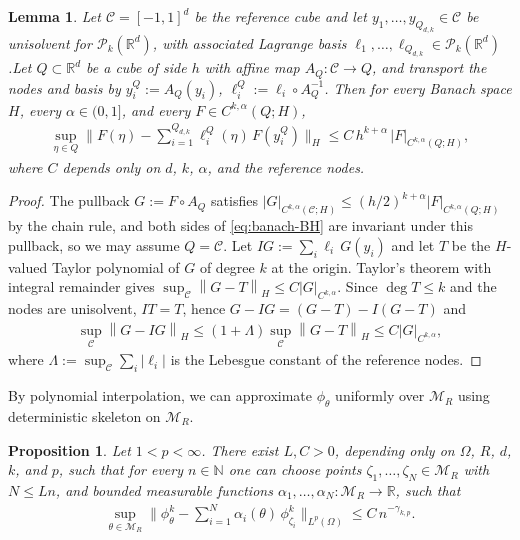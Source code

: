 \documentclass[12pt]{article}
\numberwithin{equation}{section}
\newtheorem{proposition}{Proposition}[section]
\newtheorem{lemma}{Lemma}[section]
\numberwithin{figure}{section}
\numberwithin{equation}{section}
\newcommand{\R}{\mathbb{R}}
\newcommand{\N}{\mathbb{N}}
\newcommand{\Ccal}{\mathcal C}
\newcommand{\MR}{\mathcal M_R}
\newcommand{\norm}[1]{\left\|#1\right\|}
\newcommand{\abs}[1]{\left|#1\right|}
\begin{document}
\begin{lemma}
\label{lem:banach-bramble-hilbert}
Let $\mathcal{C}=[-1,1]^d$ be the reference cube and let
$y_1,\dots,y_{Q_{d,k}}\in\mathcal{C}$ be unisolvent for $\mathcal{P}_k(\mathbb{R}^d)$,
with associated Lagrange basis
$\ell_1,\dots,\ell_{Q_{d,k}}\in\mathcal{P}_k(\mathbb{R}^d)$.Let $Q\subset\R^d$ be a cube of side $h$ with affine map $A_Q:\Ccal\to Q$, and transport the nodes and basis by
$y_i^Q:=A_Q(y_i)$, $\ell_i^Q:=\ell_i\circ A_Q^{-1}$. Then for every Banach space
$H$, every $\alpha\in(0,1]$, and every $F\in C^{k,\alpha}(Q;H)$,
\begin{align}
    \sup_{\eta\in Q}
    \Big\|F(\eta)-\sum_{i=1}^{Q_{d,k}}\ell_i^Q(\eta)\,F(y_i^Q)\Big\|_H
    \le
    C\,h^{k+\alpha}\,\abs{F}_{C^{k,\alpha}(Q;H)},
    \label{eq:banach-BH}
\end{align}
where $C$ depends only on $d$, $k$, $\alpha$, and the reference nodes.
\end{lemma}

\begin{proof}
The pullback $G:=F\circ A_Q$ satisfies
$\abs{G}_{C^{k,\alpha}(\Ccal;H)}\le(h/2)^{k+\alpha}\abs{F}_{C^{k,\alpha}(Q;H)}$ by
the chain rule, and both sides of \eqref{eq:banach-BH} are invariant under this
pullback, so we may assume $Q=\Ccal$. Let $IG:=\sum_i\ell_i\,G(y_i)$ and let $T$
be the $H$-valued Taylor polynomial of $G$ of degree $k$ at the origin. Taylor's
theorem with integral remainder gives
$\sup_\Ccal\norm{G-T}_H\le C\abs{G}_{C^{k,\alpha}}$. Since $\deg T\le k$ and the
nodes are unisolvent, $IT=T$, hence $G-IG=(G-T)-I(G-T)$ and
\begin{align*}
    \sup_\Ccal\norm{G-IG}_H
    \le(1+\Lambda)\sup_\Ccal\norm{G-T}_H
    \le C\abs{G}_{C^{k,\alpha}},
\end{align*}
where $\Lambda:=\sup_\Ccal\sum_i\abs{\ell_i}$ is the Lebesgue constant of the
reference nodes.
\end{proof}

By polynomial interpolation, we can approximate $\phi_{\theta}$ uniformly over
$\mathcal{M}_R$ using deterministic skeleton on $\MR$.
\begin{proposition}
\label{prop:deterministic-skeleton}
Let $1<p<\infty$. There exist $L,C>0$, depending only on $\Omega$, $R$, $d$,
$k$, and $p$, such that for every $n\in\N$ one can choose points
$\zeta_1,\dots,\zeta_N\in\MR$ with $N\le Ln$, and bounded measurable functions
$\alpha_1,\dots,\alpha_N:\MR\to\R$, such that
\begin{align}
    \sup_{\theta\in\MR}
    \Big\|\phi^k_\theta-\sum_{i=1}^N\alpha_i(\theta)\,\phi^k_{\zeta_i}
    \Big\|_{L^p(\Omega)}
    \le C\,n^{-\gamma_{k,p}}.
    \label{eq:skeleton-error}
\end{align}
\end{proposition}
\end{document}
